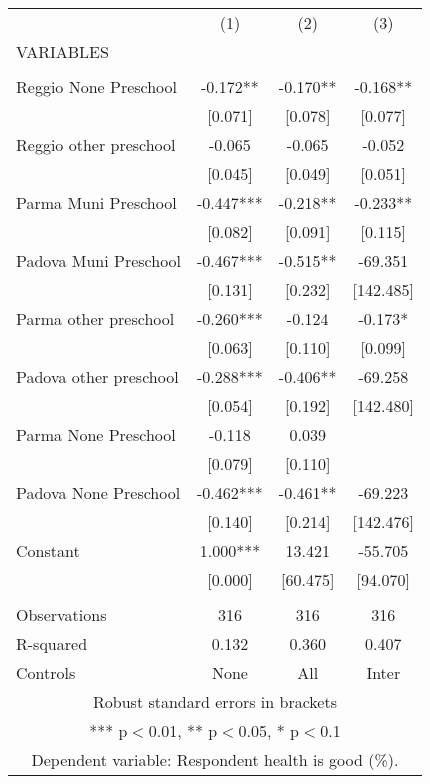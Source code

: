\begin{tabular}{lccc} \hline
 & (1) & (2) & (3) \\
VARIABLES &  &  &  \\ \hline
 &  &  &  \\
Reggio None Preschool & -0.172** & -0.170** & -0.168** \\
 & [0.071] & [0.078] & [0.077] \\
Reggio other preschool & -0.065 & -0.065 & -0.052 \\
 & [0.045] & [0.049] & [0.051] \\
Parma Muni Preschool & -0.447*** & -0.218** & -0.233** \\
 & [0.082] & [0.091] & [0.115] \\
Padova Muni Preschool & -0.467*** & -0.515** & -69.351 \\
 & [0.131] & [0.232] & [142.485] \\
Parma other preschool & -0.260*** & -0.124 & -0.173* \\
 & [0.063] & [0.110] & [0.099] \\
Padova other preschool & -0.288*** & -0.406** & -69.258 \\
 & [0.054] & [0.192] & [142.480] \\
Parma None Preschool & -0.118 & 0.039 &  \\
 & [0.079] & [0.110] &  \\
Padova None Preschool & -0.462*** & -0.461** & -69.223 \\
 & [0.140] & [0.214] & [142.476] \\
Constant & 1.000*** & 13.421 & -55.705 \\
 & [0.000] & [60.475] & [94.070] \\
 &  &  &  \\
Observations & 316 & 316 & 316 \\
R-squared & 0.132 & 0.360 & 0.407 \\
 Controls & None & All & Inter \\ \hline
\multicolumn{4}{c}{ Robust standard errors in brackets} \\
\multicolumn{4}{c}{ *** p$<$0.01, ** p$<$0.05, * p$<$0.1} \\
\multicolumn{4}{c}{ Dependent variable: Respondent health is good (\%).} \\
\end{tabular}
